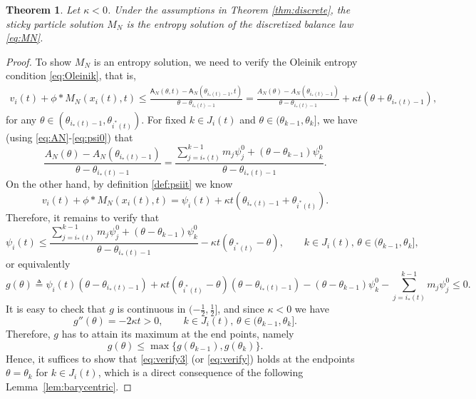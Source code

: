 \documentclass[10pt,a4paper]{amsart}
\newtheorem{theorem}{Theorem}[section]
\def\A{\mathsf{A}}
\begin{document}
	
	\begin{theorem}\label{thm:discreteattractive}
		Let $\kappa<0$. Under the assumptions in Theorem \ref{thm:discrete}, the sticky particle solution $M_N$ is the entropy solution of the discretized balance law \eqref{eq:MN}.	
	\end{theorem}
	\begin{proof}
		To show $M_N$ is an entropy solution, we need to verify the Oleinik entropy condition \eqref{eq:Oleinik}, that is,
		\begin{align*}
			v_i(t) + \phi\ast M_N(x_i(t),t)  \le \frac{\A_N(\theta,t) - \A_N(\theta_{i_*(t)-1},t)}{\theta - \theta_{i_*(t)-1}} = \frac{A_N(\theta) - A_N(\theta_{i_*(t)-1})}{\theta - \theta_{i_*(t)-1}} + \kappa t (\theta+\theta_{i_*(t)-1}),
		\end{align*}
		for any $\theta\in (\theta_{i_*(t)-1}, \theta_{i^*(t)})$.
		For fixed $k\in J_i(t)$ and $\theta\in (\theta_{k-1}, \theta_k]$, we have (using \eqref{eq:AN}-\eqref{eq:psi0}) that
		\[
		\frac{A_N(\theta) - A_N(\theta_{i_*(t)-1})}{\theta - \theta_{i_*(t)-1}} = \frac{\sum_{j=i_*(t)}^{k-1} m_j\psi_j^0 + (\theta-\theta_{k-1})\psi_k^0}{\theta - \theta_{i_*(t)-1}}.%
		\]
		On the other hand, by definition \eqref{def:psiit} we know
		\[
		v_i(t) + \phi\ast M_N(x_i(t),t) = \psi_i(t) + \kappa t(\theta_{i_*(t)-1}+\theta_{i^*(t)}).
		\]
		Therefore, it remains to verify that
		\begin{equation}\label{eq:verify}
			\psi_i(t) \leq \frac{\sum_{j=i_*(t)}^{k-1} m_j\psi_j^0 + (\theta-\theta_{k-1})\psi_k^0}{\theta - \theta_{i_*(t)-1}} - \kappa t (\theta_{i^*(t)}-\theta),
			\qquad k\in J_i(t),\, \theta\in(\theta_{k-1}, \theta_k],
		\end{equation}
		or equivalently
		\begin{equation}\label{eq:verify3}
			g(\theta)\triangleq\psi_i(t)(\theta - \theta_{i_*(t)-1}) + \kappa t (\theta_{i^*(t)}-\theta)(\theta - \theta_{i_*(t)-1}) - (\theta-\theta_{k-1})\psi_k^0  - \sum_{j=i_*(t)}^{k-1} m_j\psi_j^0 \leq 0.
		\end{equation}
		It is easy to check that $g$ is continuous in $(-\frac12,\frac12]$, and since $\kappa<0$ we have
		\[
		g''(\theta) = -2\kappa t >0,\qquad k\in J_i(t),\, \theta\in(\theta_{k-1}, \theta_k].
		\]
		Therefore, $g$ has to attain its maximum at the end points, namely
		\[
		g(\theta)\leq \max\{g(\theta_{k-1}),g(\theta_k)\}.
		\]
		Hence, it suffices to show that \eqref{eq:verify3} (or \eqref{eq:verify}) holds at the endpoints $\theta=\theta_k$ for $k\in J_i(t)$, which is a direct consequence of the following Lemma~\ref{lem:barycentric}.
	\end{proof}
	
\end{document}
